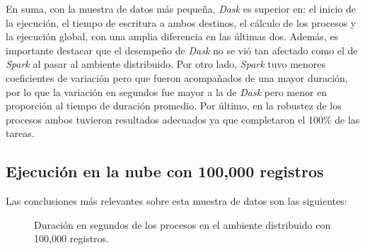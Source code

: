 En suma, con la muestra de datos más pequeña, \textit{Dask} es superior en: el inicio de la ejecución, el tiempo de escritura a ambos destinos, el cálculo de los procesos y la ejecución global, con una amplia diferencia en las últimas dos. Además, es importante destacar que el desempeño de \textit{Dask} no se vió tan afectado como el de \textit{Spark} al pasar al ambiente distribuido. Por otro lado, \textit{Spark} tuvo menores coeficientes de variación pero que fueron acompañados de una mayor duración, por lo que la variación en segundos fue mayor a la de \textit{Dask} pero menor en proporción al tiempo de duración promedio. Por último, en la robustez de los procesos ambos tuvieron resultados adecuados ya que completaron el 100\% de las tareas.

\subsection{Ejecución en la nube con 100,000 registros}

Las conclusiones más relevantes sobre esta muestra de datos son las siguientes:

\begin{center}
\begin{figure}
\caption{Duración en segundos de los procesos en el ambiente distribuido con 100,000 registros.}
\label{barras:nube-duracion100K}
\end{figure}
\end{center}


